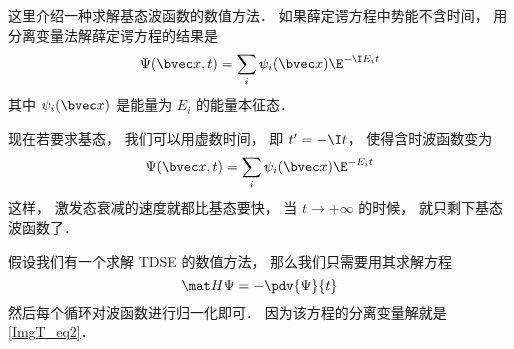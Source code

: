 
这里介绍一种求解基态波函数的数值方法． 如果薛定谔方程中势能不含时间， 用分离变量法解薛定谔方程的结果是
\begin{equation}
\Psi(\bvec x, t) = \sum_i \psi_i(\bvec x) \E^{-\I E_i t}
\end{equation}
其中 $\psi_i(\bvec x)$ 是能量为 $E_i$ 的能量本征态．

现在若要求基态， 我们可以用虚数时间， 即 $t' = -\I t$， 使得含时波函数变为
\begin{equation}\label{ImgT_eq2}
\Psi(\bvec x, t) = \sum_i \psi_i(\bvec x) \E^{- E_i t}
\end{equation}
这样， 激发态衰减的速度就都比基态要快， 当 $t \to +\infty$ 的时候， 就只剩下基态波函数了．

假设我们有一个求解 TDSE 的数值方法， 那么我们只需要用其求解方程
\begin{equation}
\mat H\Psi = -\pdv{\Psi}{t}
\end{equation}
然后每个循环对波函数进行归一化即可． 因为该方程的分离变量解就是\autoref{ImgT_eq2}．